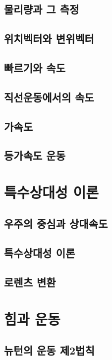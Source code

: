 \documentclass[10pt,a4paper]{report}
\begin{document}
	\section{물리량과 그 측정}
	
	\section{위치벡터와 변위벡터}
	
	\section{빠르기와 속도}
	
	\section{직선운동에서의 속도}
	
	\section{가속도}
	
	\section{등가속도 운동}
	
	\chapter{특수상대성 이론}
	
	\section{우주의 중심과 상대속도}
	
	\section{특수상대성 이론}
	
	\section{로렌츠 변환}
	
	\chapter{힘과 운동}
	
	\section{뉴턴의 운동 제2법칙}
	
\end{document}
